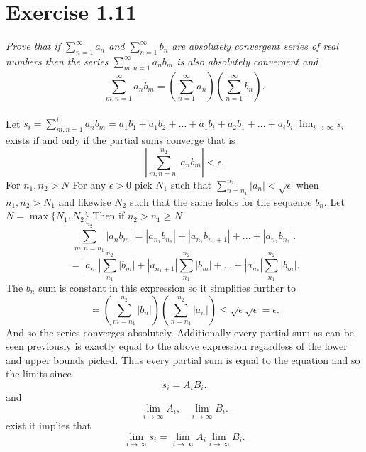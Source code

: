 \documentclass{amsart}
\begin{document}
        \section{Exercise 1.11}
        \emph{
            Prove that if $\sum_{n=1}^{\infty}a_n$ and $\sum_{n=1}^{\infty}b_n$ are absolutely convergent
            series of real numbers then the series $\sum_{m,n=1}^{\infty}a_nb_m$ is also absolutely convergent
            and 
            \[
            \sum_{m,n=1}^{\infty}a_nb_m = (\sum_{n=1}^{\infty}a_n)(\sum_{n=1}^{\infty}b_n)
            .\] 
        }\\
        Let $s_i = \sum_{m,n=1}^{i}a_nb_m = a_1b_1+a_1b_2+...+a_1b_i+a_2b_1+...+a_ib_i$
        $\lim_{i\to \infty}s_i$ exists if and only if the partial sums converge
        that is
        \[
        |\sum_{m,n=n_1}^{n_2}a_nb_m| < \epsilon
        .\] 
        For $n_1,n_2 > N$
        For any $\epsilon > 0$ pick $N_1$ such that $\sum_{n=n_1}^{n_2}|a_n| < \sqrt{\epsilon}$ when $n_1,n_2 > N_1$ and likewise $N_2$ such that
        the same holds for the sequence $b_n$. Let $N = \max\{N_1,N_2\}$ Then if $n_2 > n_1 \ge N$
        \[
            \sum_{m,n = n_1}^{n_2}|a_nb_m| = |a_{n_1}b_{n_1}| + |a_{n_1}b_{n_1+1}| + ... + |a_{n_2}b_{n_2}|
        .\] 
        \[
            = |a_{n_1}|\sum_{n_1}^{n_2}|b_m| + |a_{n_1+1}|\sum_{n_1}^{n_2}|b_m| +... + |a_{n_2}|\sum_{n_1}^{n_2}|b_m|
        .\] 
        The $b_n$ sum is constant in this expression so it simplifies further to
        \[
        = (\sum_{m=n_1}^{n_2}|b_n|)(\sum_{n=n_1}^{n_2}|a_n|) \le \sqrt{\epsilon} \sqrt{\epsilon} = \epsilon
        .\] 
        And so the series converges absolutely.
        Additionally every partial sum as can be seen previously is exactly equal to the above expression
        regardless of the lower and upper bounds picked. Thus every partial sum is equal to the equation and so the limits
        since
        \[
        s_i = A_iB_i 
        .\] 
        and
        \[
        \lim_{i\to \infty}A_i,  \;\;\; \lim_{i\to \infty}B_i
        .\] 
        exist it implies that
        \[
        \lim_{i\to \infty}s_i = \lim_{i\to \infty}A_i \lim_{i\to \infty}B_i
        .\] 
\end{document}
